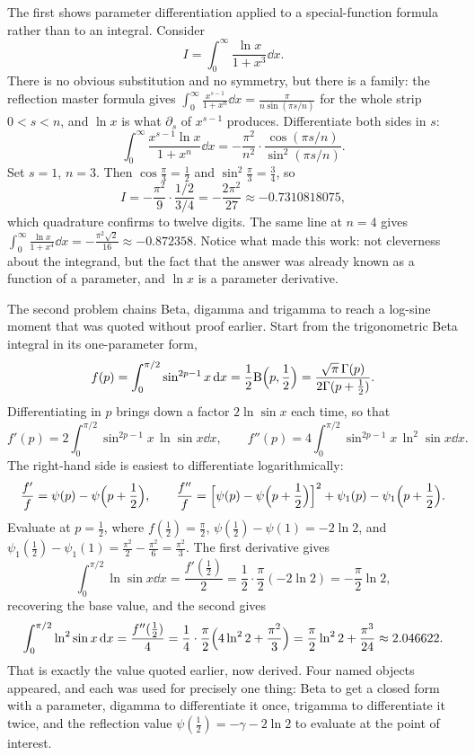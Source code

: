 The first shows parameter differentiation applied to a special-function formula rather than to an integral. Consider
\[I=\int_0^{\infty}\frac{\ln x}{1+x^{3}}\dd x.\]
There is no obvious substitution and no symmetry, but there is a family: the reflection master formula gives $\int_0^{\infty}\frac{x^{s-1}}{1+x^{n}}\dd x=\frac{\pi}{n\sin(\pi s/n)}$ for the whole strip $0<s<n$, and $\ln x$ is what $\partial_s$ of $x^{s-1}$ produces. Differentiate both sides in $s$:
\[\int_0^{\infty}\frac{x^{s-1}\ln x}{1+x^{n}}\dd x=-\frac{\pi^{2}}{n^{2}}\cdot\frac{\cos(\pi s/n)}{\sin^{2}(\pi s/n)}.\]
Set $s=1$, $n=3$. Then $\cos\tfrac\pi3=\tfrac12$ and $\sin^{2}\tfrac\pi3=\tfrac34$, so
\[I=-\frac{\pi^{2}}{9}\cdot\frac{1/2}{3/4}=-\frac{2\pi^{2}}{27}\approx-0.7310818075,\]
which quadrature confirms to twelve digits. The same line at $n=4$ gives $\int_0^{\infty}\frac{\ln x}{1+x^{4}}\dd x=-\frac{\pi^{2}\sqrt2}{16}\approx-0.872358$. Notice what made this work: not cleverness about the integrand, but the fact that the answer was already known as a function of a parameter, and $\ln x$ is a parameter derivative.

The second problem chains Beta, digamma and trigamma to reach a log-sine moment that was quoted without proof earlier. Start from the trigonometric Beta integral in its one-parameter form,
\[f(p)=\int_0^{\pi/2}\sin^{2p-1}x\,\mathrm{d} x=\frac12\mathrm{B}\Bigl(p,\frac12\Bigr)=\frac{\sqrt\pi\,\Gamma(p)}{2\Gamma(p+\tfrac12)}.\]
Differentiating in $p$ brings down a factor $2\ln\sin x$ each time, so that
\[f'(p)=2\int_0^{\pi/2}\sin^{2p-1}x\,\ln\sin x\dd x,\qquad f''(p)=4\int_0^{\pi/2}\sin^{2p-1}x\,\ln^{2}\sin x\dd x.\] The right-hand side is easiest to differentiate logarithmically:
\[\frac{f'}{f}=\psi(p)-\psi\Bigl(p+\frac12\Bigr),\qquad \frac{f''}{f}=\Bigl[\psi(p)-\psi\Bigl(p+\frac12\Bigr)\Bigr]^{2}+\psi_1(p)-\psi_1\Bigl(p+\frac12\Bigr).\]
Evaluate at $p=\tfrac12$, where $f(\tfrac12)=\tfrac\pi2$, $\psi(\tfrac12)-\psi(1)=-2\ln2$, and $\psi_1(\tfrac12)-\psi_1(1)=\tfrac{\pi^{2}}{2}-\tfrac{\pi^{2}}{6}=\tfrac{\pi^{2}}{3}$. The first derivative gives
\[\int_0^{\pi/2}\ln\sin x\dd x=\frac{f'(\tfrac12)}{2}=\frac{1}{2}\cdot\frac{\pi}{2}(-2\ln2)=-\frac{\pi}{2}\ln2,\]
recovering the base value, and the second gives
\[\int_0^{\pi/2}\ln^{2}\sin x\,\mathrm{d} x=\frac{f''(\tfrac12)}{4}=\frac14\cdot\frac{\pi}{2}\Bigl(4\ln^{2}2+\frac{\pi^{2}}{3}\Bigr)=\frac{\pi}{2}\ln^{2}2+\frac{\pi^{3}}{24}\approx2.046622.\]
That is exactly the value quoted earlier, now derived. Four named objects appeared, and each was used for precisely one thing: Beta to get a closed form with a parameter, digamma to differentiate it once, trigamma to differentiate it twice, and the reflection value $\psi(\tfrac12)=-\gamma-2\ln2$ to evaluate at the point of interest.


